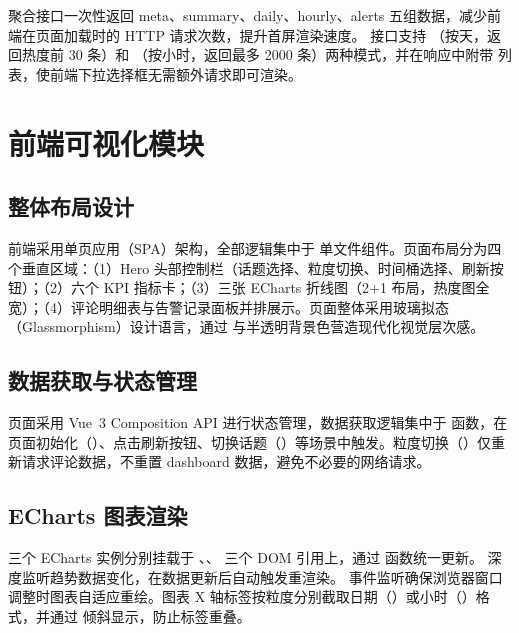  聚合接口一次性返回 meta、summary、daily、hourly、alerts 五组数据，减少前端在页面加载时的 HTTP 请求次数，提升首屏渲染速度。 接口支持 （按天，返回热度前 30 条）和 （按小时，返回最多 2000 条）两种模式，并在响应中附带  列表，使前端下拉选择框无需额外请求即可渲染。

\section{前端可视化模块}

\subsection{整体布局设计}

前端采用单页应用（SPA）架构，全部逻辑集中于  单文件组件。页面布局分为四个垂直区域：（1）Hero 头部控制栏（话题选择、粒度切换、时间桶选择、刷新按钮）；（2）六个 KPI 指标卡；（3）三张 ECharts 折线图（2+1 布局，热度图全宽）；（4）评论明细表与告警记录面板并排展示。页面整体采用玻璃拟态（Glassmorphism）设计语言，通过  与半透明背景色营造现代化视觉层次感。

\subsection{数据获取与状态管理}

页面采用 Vue~3 Composition API 进行状态管理，数据获取逻辑集中于  函数，在页面初始化（）、点击刷新按钮、切换话题（）等场景中触发。粒度切换（）仅重新请求评论数据，不重置 dashboard 数据，避免不必要的网络请求。

\subsection{ECharts 图表渲染}

三个 ECharts 实例分别挂载于 、、 三个 DOM 引用上，通过  函数统一更新。 深度监听趋势数据变化，在数据更新后自动触发重渲染。 事件监听确保浏览器窗口调整时图表自适应重绘。图表 X 轴标签按粒度分别截取日期（）或小时（）格式，并通过  倾斜显示，防止标签重叠。

